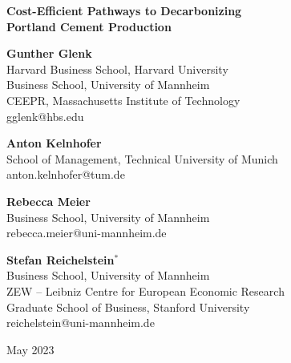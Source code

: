 \documentclass[12pt, a4paper]{article} %
\begin{document}
\renewcommand{\thefootnote}{\fnsymbol{footnote}}
\thispagestyle{empty}
\setcounter{footnote}{0}
\setlength{\baselineskip}{20pt} \thispagestyle{empty}
\renewcommand{\thefootnote}{\fnsymbol{footnote}}

\begin{center}
\hbox{}
{\Large\textbf{Cost-Efficient Pathways to Decarbonizing \\ Portland Cement Production}}

\bigskip
\bigskip
{\bf Gunther Glenk}\footnotemark \\
Harvard Business School, Harvard University \\
Business School, University of Mannheim \\
CEEPR, Massachusetts Institute of Technology \\
gglenk@hbs.edu

\bigskip
\bigskip
{\bf Anton Kelnhofer} \\
School of Management, Technical University of Munich\\
anton.kelnhofer@tum.de

\bigskip
\bigskip
{\bf Rebecca Meier} \\
Business School, University of Mannheim \\
rebecca.meier@uni-mannheim.de

\bigskip
\bigskip

{\bf Stefan Reichelstein}$^*$ \\
Business School, University of Mannheim \\
ZEW -- Leibniz Centre for European Economic Research \\
Graduate School of Business, Stanford University \\
reichelstein@uni-mannheim.de

\bigskip
\bigskip
May 2023



\end{center}
\renewcommand{\thefootnote}{\arabic{footnote}}
\setcounter{footnote}{0}
\end{document}
